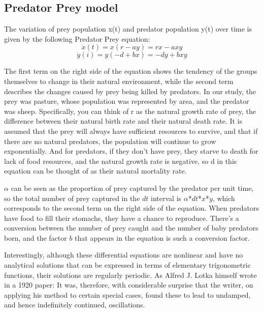 \documentclass[12pt]{article}  %
\newenvironment{shrinkeq}[1]
{ \bgroup
	\addtolength\abovedisplayshortskip{#1}
	\addtolength\abovedisplayskip{#1}
	\addtolength\belowdisplayshortskip{#1}
	\addtolength\belowdisplayskip{#1}}
{\egroup\ignorespacesafterend}
\begin{document}
\subsection{Predator Prey model}
The variation of prey population x(t) and predator population y(t) over time is given by the following Predator Prey equation:
\begin{shrinkeq}{-1ex}
	\begin{equation}
    \label{eq:eq16}
	\dot{x}(t)=x(r-a y)=r x-a x y 
	\end{equation}
\end{shrinkeq}
\begin{shrinkeq}{-1ex}
	\begin{equation}
    \label{eq:eq17}
	\dot{y}(i)=y(-d+b x)=-d y+b x y
	\end{equation}
\end{shrinkeq}

The first term on the right side of the equation shows the tendency of the groups themselves to change in their natural environment, while the second term describes the changes caused by prey being killed by predators. In our study, the prey was pasture, whose population was represented by area, and the predator was sheep. 
Specifically, you can think of r as the natural growth rate of prey, the difference between their natural birth rate and their natural death rate. It is assumed that the prey will always have sufficient resources to survive, and that if there are no natural predators, the population will continue to grow exponentially. And for predators, if they don't have prey, they starve to death for lack of food resources, and the natural growth rate is negative, so d in this equation can be thought of as their natural mortality rate. 

 $\alpha$ can be seen as the proportion of prey captured by the predator per unit time, so the total number of prey captured in the $dt$ interval is $\alpha$*$dt$*$x$*$y$, which corresponds to the second term on the right side of the equation. When predators have food to fill their stomachs, they have a chance to reproduce. There's a conversion between the number of prey caught and the number of baby predators born, and the factor $b$ that appears in the equation is such a conversion factor. 

Interestingly, although these differential equations are nonlinear and have no analytical solutions that can be expressed in terms of elementary trigonometric functions, their solutions are regularly periodic. As Alfred J. Lotka himself wrote in a 1920 paper: It was, therefore, with considerable surprise that the writer, on applying his method to certain special cases, found these to lead to undamped, and hence indefinitely continued, oscillations.
\end{document}
